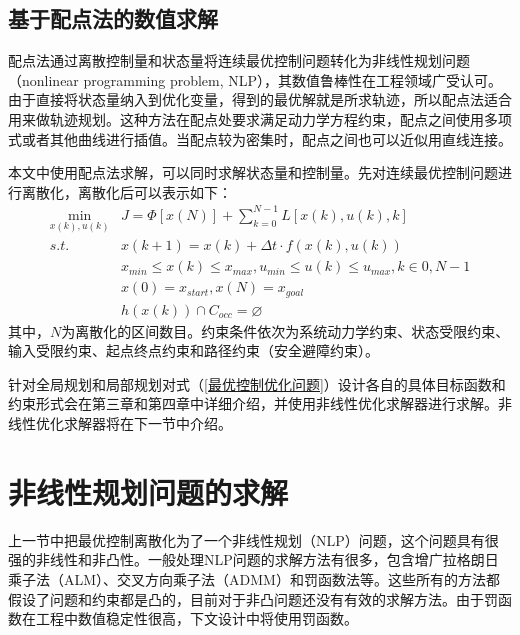 \documentclass[master,academic]{ysuthesis} %
\begin{document}
	\subsection{基于配点法的数值求解}
	配点法通过离散控制量和状态量将连续最优控制问题转化为非线性规划问题（nonlinear programming problem, NLP），其数值鲁棒性在工程领域广受认可。由于直接将状态量纳入到优化变量，得到的最优解就是所求轨迹，所以配点法适合用来做轨迹规划。这种方法在配点处要求满足动力学方程约束，配点之间使用多项式或者其他曲线进行插值。当配点较为密集时，配点之间也可以近似用直线连接。

	本文中使用配点法求解，可以同时求解状态量和控制量。先对连续最优控制问题进行离散化，离散化后可以表示如下：
	\begin{equation}
	\begin{aligned}
		\min_{x(k),u(k)} &J = \Phi[x(N)]+\sum_{k=0}^{N-1}L[x(k),u(k),k]\\
			s.t. \ \ \ &x(k+1) = x(k)+ \Delta t \cdot f(x(k),u(k))\\
			&x_{min}\le x(k) \le x_{max},u_{min}\le u(k) \le u_{max},k \in{0,N-1}\\
			&x(0)=x_{start},x(N)=x_{goal}\\
			&h(x(k))\cap C_{occ}=\varnothing 
	\end{aligned}
	\label{最优控制优化问题}
	\end{equation}
	其中，$N$为离散化的区间数目。约束条件依次为系统动力学约束、状态受限约束、输入受限约束、起点终点约束和路径约束（安全避障约束）。

	针对全局规划和局部规划对式（\ref{最优控制优化问题}）设计各自的具体目标函数和约束形式会在第三章和第四章中详细介绍，并使用非线性优化求解器进行求解。非线性优化求解器将在下一节中介绍。

	\section{非线性规划问题的求解}
	上一节中把最优控制离散化为了一个非线性规划（NLP）问题，这个问题具有很强的非线性和非凸性。一般处理NLP问题的求解方法有很多，包含增广拉格朗日乘子法（ALM）、交叉方向乘子法（ADMM）和罚函数法等。这些所有的方法都假设了问题和约束都是凸的，目前对于非凸问题还没有有效的求解方法。由于罚函数在工程中数值稳定性很高，下文设计中将使用罚函数。
\end{document}
